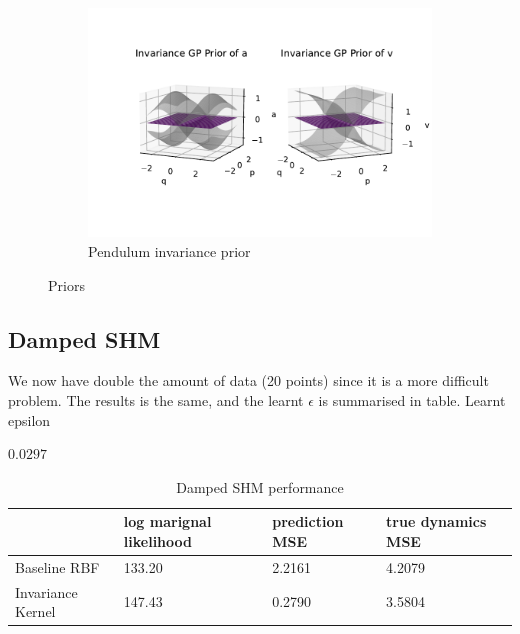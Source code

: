 \documentclass{statsmsc}
\begin{document}
\begin{figure}[H]
\begin{subfigure}[b]{\linewidth}
         \includegraphics[width=\linewidth]{../codes/figures/prior_pendulum_invariance.pdf}
         \caption{Pendulum invariance prior}
         \label{fig:prior_pendulum_invariance}
     \end{subfigure}
        \caption{Priors}
        \label{fig:priors}
\end{figure}



\subsection{Damped SHM}
We now have double the amount of data (20 points) since it is a more difficult problem.
The results is the same, and the learnt $\epsilon$ is summarised in table. Learnt epsilon 

$0.0297$
\begin{table}[H]
  \centering
  \begin{tabular}{l l l l}
    \hline
                    & log marignal likelihood & prediction MSE  & true dynamics MSE\\
    \hline
Baseline RBF & 133.20 & 2.2161 & 4.2079 \\
Invariance Kernel & 147.43 & 0.2790 & 3.5804 \\
    \hline
  \end{tabular}
  \caption{Damped SHM performance }
  \label{tab:damped_shm_performance}
\end{table}
\end{document}
